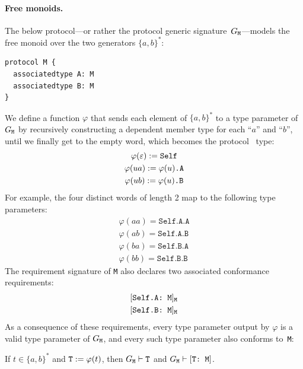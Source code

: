 \documentclass[../generics]{subfiles}
\begin{document}
\paragraph{Free monoids.} The below protocol---or rather the protocol generic signature~$G_\texttt{M}$---models the free monoid over the two generators $\{a,b\}^*$:
\begin{Verbatim}
protocol M {
  associatedtype A: M
  associatedtype B: M
}
\end{Verbatim}
We define a function $\varphi$ that sends each element of $\{a,b\}^*$ to a type parameter of $G_\texttt{M}$ by recursively constructing a dependent member type for each ``$a$'' and ``$b$'', until we finally get to the empty word, which becomes the protocol \tSelf\ type:
\begin{gather*}
\varphi(\varepsilon):=\texttt{Self}\\
\varphi(ua):=\texttt{$\varphi(u)$.A}\\
\varphi(ub):=\texttt{$\varphi(u)$.B}
\end{gather*}
For example, the four distinct words of length 2 map to the following type parameters:
\begin{gather*}
\varphi(aa)=\texttt{Self.A.A}\\
\varphi(ab)=\texttt{Self.A.B}\\
\varphi(ba)=\texttt{Self.B.A}\\
\varphi(bb)=\texttt{Self.B.B}
\end{gather*}
The requirement signature of \texttt{M} also declares two associated conformance requirements:
\begin{gather*}
\AssocConfReq{Self.A}{M}{M}\\
\AssocConfReq{Self.B}{M}{M}
\end{gather*}
As a consequence of these requirements, every type parameter output by $\varphi$ is a valid type parameter of $G_\texttt{M}$, and every such type parameter also conforms to~\texttt{M}:
\begin{proposition}\label{monoid type lemma} If $t\in \{a,b\}^*$ and $\texttt{T}:=\varphi(t)$, then $G_\texttt{M}\vdash\texttt{T}$ and $G_\texttt{M}\vdash[\texttt{T:~M}]$.
\end{proposition}
\end{document}
